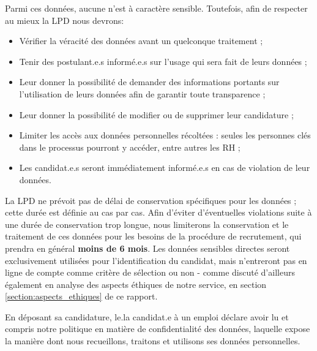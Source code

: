 Parmi ces données, aucune n'est à caractère sensible. Toutefois, afin de respecter au mieux la LPD nous devrons:\newline

\begin{itemize}
    \item Vérifier la véracité des données avant un quelconque traitement ;\\
    \item Tenir des postulant.e.s informé.e.s sur l'usage qui sera fait de leurs données ;\\
    \item Leur donner la possibilité de demander des informations portants sur l'utilisation de leurs données afin de garantir toute transparence ;\\
    \item Leur donner la possibilité de modifier ou de supprimer leur candidature ;\\
    \item Limiter les accès aux données personnelles récoltées : seules les personnes clés dans le processus pourront y accéder, entre autres les RH ;\\
    \item Les candidat.e.s seront immédiatement informé.e.s en cas de violation de leur données. \\
\end{itemize}

 La LPD ne prévoit pas de délai de conservation spécifiques pour les données ; cette durée est définie au cas par cas. Afin d'éviter d'éventuelles violations suite à une durée de conservation trop longue, nous limiterons la conservation et le traitement de ces données  pour les besoins de la procédure de recrutement, qui prendra en général \textbf{moins de 6 mois}. Les données sensibles directes seront exclusivement utilisées pour l'identification du candidat, mais n'entreront pas en ligne de compte comme critère de sélection ou non - comme discuté d'ailleurs également en analyse des aspects éthiques de notre service, en section \ref{section:aspects_ethiques} de ce rapport.\newline
 
En déposant sa candidature, le.la candidat.e à un emploi déclare avoir lu et compris notre politique en matière de confidentialité des données, laquelle expose la manière dont nous recueillons, traitons et utilisons ses données personnelles.